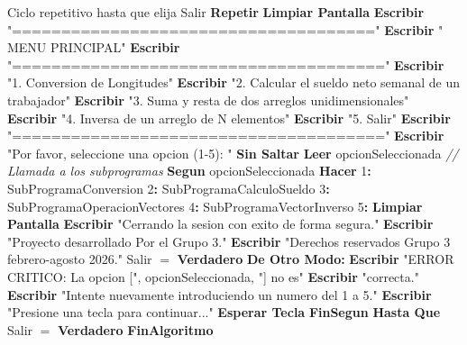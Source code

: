 \documentclass[12pt,a4paper]{article}
\newcommand{\kw}[1]{\textcolor{pseKeyword}{\textbf{#1}}}
\newcommand{\txt}[1]{\textcolor{pseString}{"#1"}}
\newcommand{\num}[1]{\textcolor{pseNumber}{#1}}
\newcommand{\cmt}[1]{\textcolor{pseComment}{\textit{// #1}}}
\newcommand{\opAsig}{\textcolor{pseKeyword}{$=$}}
\newcommand{\opIgual}{\textcolor{pseKeyword}{$=$}}
\newcommand{\Asignacion}[2]{#1\; \opAsig\; #2}
\newcommand{\Escribir}[1]{\kw{Escribir} #1}
\newcommand{\EscribirSS}[1]{\kw{Escribir} #1 \kw{Sin Saltar}}
\newcommand{\Leer}[1]{\kw{Leer} #1}
\newcommand{\Repetir}{\kw{Repetir}}
\newcommand{\HastaQue}[1]{\kw{Hasta Que} #1}
\newcommand{\Segun}[1]{\kw{Segun} #1 \kw{Hacer}}
\newcommand{\FinSegun}{\kw{FinSegun}}
\newcommand{\DeOtroModo}{\kw{De Otro Modo:}}
\newcommand{\I}{\hspace{1.5em}}
\newcommand{\II}{\hspace{3.0em}}
\newcommand{\III}{\hspace{4.5em}}
\newcommand{\IV}{\hspace{5.5em}}
\begin{document}
\begin{algorithmic}[1]
		
		\State \I \kw \cmt{Ciclo repetitivo hasta que elija Salir}
		\State \I \kw \Repetir
		\State \II \kw{Limpiar Pantalla}
		\State \II \Escribir{\txt{=====================================}}
		\State \II \Escribir{\txt{              MENU PRINCIPAL}}
		\State \II \Escribir{\txt{======================================}}
		\State \II \Escribir{\txt{1. Conversion de Longitudes}}
		\State \II \Escribir{\txt{2. Calcular el sueldo neto semanal de un trabajador}}
		\State \II \Escribir{\txt{3. Suma y resta de dos arreglos unidimensionales}}
		\State \II \Escribir{\txt{4. Inversa de un arreglo de N elementos}}
		\State \II \Escribir{\txt{5. Salir}}
		\State \II \Escribir{\txt{======================================}}
		\State \II \EscribirSS{\txt{Por favor, seleccione una opcion (1-5): }}
		\State \II \Leer{opcionSeleccionada}
		\State
		\State \II \cmt{Llamada a los subprogramas}
		\State \II \Segun{opcionSeleccionada}
		\State \III \num{1}\textbf{:}
		\State \IV SubProgramaConversion
		\State \III \num{2}\textbf{:}
		\State \IV SubProgramaCalculoSueldo
		\State \III \num{3}\textbf{:}
		\State \IV SubProgramaOperacionVectores
		\State \III \num{4}\textbf{:}
		\State \IV SubProgramaVectorInverso
		\State \III \num{5}\textbf{:}
		\State \IV \kw{Limpiar Pantalla}
		\State \IV \Escribir{\txt{Cerrando la sesion con exito de forma segura.}}
		\State \IV \Escribir{\txt{Proyecto desarrollado Por el Grupo 3.}}
		\State \IV \Escribir{\txt{Derechos reservados Grupo 3 febrero-agosto 2026.}}
		\State \IV \Asignacion{Salir}{\kw{Verdadero}}
		\State \III \DeOtroModo
		\State \III \Escribir{\txt{ERROR CRITICO: La opcion [}, opcionSeleccionada, \txt{] no es}}
		\State \III \Escribir{\txt{correcta.}}
		\State \IV \Escribir{\txt{Intente nuevamente introduciendo un numero del 1 a 5.}}
		\State \IV \Escribir{\txt{Presione una tecla para continuar...}}
		\State \IV \kw{Esperar Tecla}
		\State \II \FinSegun
		\State \I \HastaQue{Salir \opIgual{} \kw{Verdadero}}
		\State
		\State \kw{FinAlgoritmo}
		

\end{algorithmic}
\end{document}
